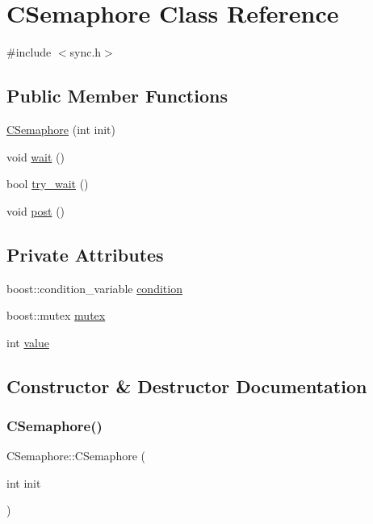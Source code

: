 \hypertarget{class_c_semaphore}{}\section{C\+Semaphore Class Reference}
\label{class_c_semaphore}


{\ttfamily \#include $<$sync.\+h$>$}

\subsection*{Public Member Functions}
\begin{DoxyCompactItemize}
\item 
\mbox{\hyperlink{class_c_semaphore_ac9cc749c7424852d7fb4378811d0dae1}{C\+Semaphore}} (int init)
\item 
void \mbox{\hyperlink{class_c_semaphore_a1c108bd981fe68527ec8ef5e7b0d116c}{wait}} ()
\item 
bool \mbox{\hyperlink{class_c_semaphore_abb8a07e6cac29dc72f044cd536a9f9e5}{try\+\_\+wait}} ()
\item 
void \mbox{\hyperlink{class_c_semaphore_af6a956f6c191e824485fd3af6db39318}{post}} ()
\end{DoxyCompactItemize}
\subsection*{Private Attributes}
\begin{DoxyCompactItemize}
\item 
boost\+::condition\+\_\+variable \mbox{\hyperlink{class_c_semaphore_afe13b8e59776248a0c49f9f2b31107fb}{condition}}
\item 
boost\+::mutex \mbox{\hyperlink{class_c_semaphore_ac871c4228d6a9b7f67f340ba693a629d}{mutex}}
\item 
int \mbox{\hyperlink{class_c_semaphore_a22a51512b911d93b37411cfffc764303}{value}}
\end{DoxyCompactItemize}


\subsection{Constructor \& Destructor Documentation}
\mbox{\label{class_c_semaphore_ac9cc749c7424852d7fb4378811d0dae1}} 
\subsubsection{\texorpdfstring{C\+Semaphore()}{CSemaphore()}}
{\footnotesize\ttfamily C\+Semaphore\+::\+C\+Semaphore (\begin{DoxyParamCaption}\item[{int}]{init }\end{DoxyParamCaption})\hspace{0.3cm}{\ttfamily [inline]}}



